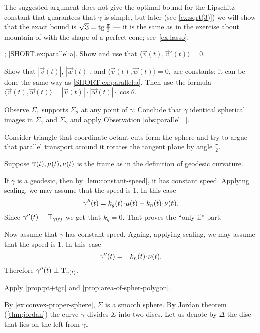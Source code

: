 The suggested argument does not give the optimal bound for the Lipschitz constant that guarantees that $\gamma$ is simple, but
later (see \ref{ex:sqrt(3)}) we will show that the exact bound is $\sqrt{3}=\operatorname{tg}\tfrac\pi3$ --- it is the same as in the exercise about mountain of with the shape of a perfect cone; see~\ref{ex:lasso}.

\parbf{\ref{ex:parallel}}; \ref{SHORT.ex:parallel:a}.
Show and use that $\langle\vec v(t),\vec v'(t)\rangle=0$.

\parit{\ref{SHORT.ex:parallel:b}}
Show that $|\vec v(t)|$, $|\vec w(t)|$, and
$\langle\vec v(t),\vec w(t)\rangle=0$,
are constants; it can be done the same way as \ref{SHORT.ex:parallel:a}.
Then use the formula 
$\langle\vec v(t),\vec w(t)\rangle=|\vec v(t)|\cdot|\vec w(t)|\cdot\cos\theta$.

\setcounter{eqtn}{0}

Observe $\Sigma_1$ supports $\Sigma_2$ at any point of $\gamma$.
Conclude that $\gamma$ identical spherical images in $\Sigma_1$ and $\Sigma_2$ and apply Observation \ref{obs:parallel=}.

Consider triangle that coordinate octant cuts form the sphere and try to argue that parallel transport around it rotates the tangent plane by angle $\tfrac\pi 2$. 

Suppose $\text{\sc{t}}(t),\mu(t),\nu(t)$ is the frame as in the definition of geodesic curvature.

If $\gamma$ is a geodesic, then by \ref{lem:constant-speed}, it has constant speed.
Applying scaling, we may assume that the speed is 1.
In this case 
\[\gamma''(t)=k_g(t)\cdot \mu(t)-k_n(t)\cdot \Norm(t).\]
Since $\gamma''(t)\perp\mathrm{T}_{\gamma(t)}$ we get that $k_g=0$. 
That proves the ``only if'' part.

Now assume that $\gamma$ has constant speed.
Againg, applying scaling, we may assume that the speed is 1.
In this case 
\[\gamma''(t)=-k_n(t)\cdot \Norm(t).\]
Therefore $\gamma''(t)\perp\mathrm{T}_{\gamma(t)}$.

\setcounter{eqtn}{0}

Apply \ref{prop:pt+tgc} and \ref{prop:area-of-spher-polygon}.

By \ref{ex:convex-proper-sphere}, $\Sigma$ is a smooth sphere.
By Jordan theorem (\ref{thm:jordan}) the curve $\gamma$ divides $\Sigma$  into two discs.
Let us denote by $\Delta$ the disc that lies on the left from $\gamma$.


